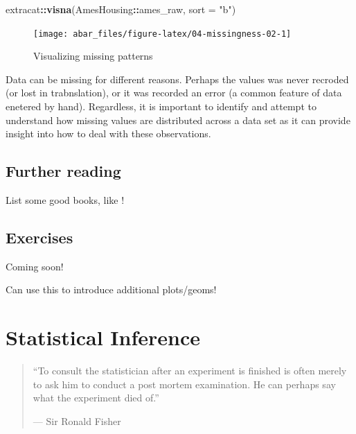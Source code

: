 \documentclass[]{book}
\newenvironment{Shaded}{\begin{snugshade}}{\end{snugshade}}
\newcommand{\DataTypeTok}[1]{\textcolor[rgb]{0.13,0.29,0.53}{#1}}
\newcommand{\KeywordTok}[1]{\textcolor[rgb]{0.13,0.29,0.53}{\textbf{#1}}}
\newcommand{\NormalTok}[1]{#1}
\newcommand{\OperatorTok}[1]{\textcolor[rgb]{0.81,0.36,0.00}{\textbf{#1}}}
\newcommand{\StringTok}[1]{\textcolor[rgb]{0.31,0.60,0.02}{#1}}
\theoremstyle{definition}
\theoremstyle{definition}
\theoremstyle{definition}
\theoremstyle{remark}
\begin{document}
\begin{Shaded}
\begin{Highlighting}[]
\NormalTok{extracat}\OperatorTok{::}\KeywordTok{visna}\NormalTok{(AmesHousing}\OperatorTok{::}\NormalTok{ames_raw, }\DataTypeTok{sort =} \StringTok{"b"}\NormalTok{)}
\end{Highlighting}
\end{Shaded}

\begin{figure}

{\centering \texttt{[image: abar\_files/figure-latex/04-missingness-02-1]} 

}

\caption{Visualizing missing patterns}\label{fig:04-missingness-02}
\end{figure}

Data can be missing for different reasons. Perhaps the values was never
recroded (or lost in trabnslation), or it was recorded an error (a
common feature of data enetered by hand). Regardless, it is important to
identify and attempt to understand how missing values are distributed
across a data set as it can provide insight into how to deal with these
observations.

\hypertarget{further-reading}{%
\section{Further reading}\label{further-reading}}

List some good books, like \citet{cleveland-visualizing-1993}!

\hypertarget{exercises-1}{%
\section{Exercises}\label{exercises-1}}

Coming soon!

Can use this to introduce additional plots/geoms!

\hypertarget{inference}{%
\chapter{Statistical Inference}\label{inference}}

\begin{quote}
``To consult the statistician after an experiment is finished is often
merely to ask him to conduct a post mortem examination. He can perhaps
say what the experiment died of.''

--- Sir Ronald Fisher
\end{quote}
\end{document}
